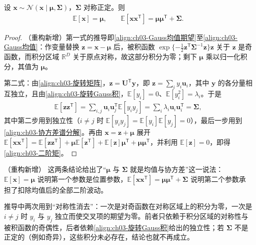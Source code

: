 \documentclass[../../main.tex]{subfiles}
\begin{document}
\begin{proposition}\label{proposition:ch03-Gauss矩}
设 $\boldsymbol{x}\sim\mathcal{N}(\boldsymbol{x}\mid\boldsymbol{\mu},\boldsymbol{\Sigma})$，$\boldsymbol{\Sigma}$ 对称正定。则
\begin{align*}
\mathbb{E}[\boldsymbol{x}]=\boldsymbol{\mu},\qquad \mathbb{E}[\boldsymbol{x}\boldsymbol{x}^{\mathsf{T}}]=\boldsymbol{\mu}\boldsymbol{\mu}^{\mathsf{T}}+\boldsymbol{\Sigma}.
\end{align*}
\end{proposition}
\begin{proof}
（重构新增）第一式的推导即\eqref{align:ch03-Gauss均值期望}至\eqref{align:ch03-Gauss均值}：作变量替换 $\boldsymbol{z}=\boldsymbol{x}-\boldsymbol{\mu}$ 后，被积函数 $\exp\{-\frac12\boldsymbol{z}^{\mathsf{T}}\boldsymbol{\Sigma}^{-1}\boldsymbol{z}\}\boldsymbol{z}$ 关于 $\boldsymbol{z}$ 是奇函数，而积分区域 $\mathbb{R}^{D}$ 关于原点对称，故这部分积分为零；剩下 $\boldsymbol{\mu}$ 乘以归一化积分，其值为 $\boldsymbol{\mu}$。

第二式：由\eqref{align:ch03-旋转矩阵}，$\boldsymbol{z}=\boldsymbol{U}^{\mathsf{T}}\boldsymbol{y}$，即 $\boldsymbol{z}=\sum_i y_i\boldsymbol{u}_i$，其中 $\boldsymbol{y}$ 的各分量相互独立，且由\eqref{align:ch03-旋转Gauss积}，$\mathbb{E}[y_i]=0$、$\mathbb{E}[y_i^{2}]=\lambda_i$。于是
\begin{align*}
\mathbb{E}[\boldsymbol{z}\boldsymbol{z}^{\mathsf{T}}]=\sum_{i,j}\boldsymbol{u}_i\boldsymbol{u}_j^{\mathsf{T}}\mathbb{E}[y_iy_j]=\sum_{i}\lambda_i\boldsymbol{u}_i\boldsymbol{u}_i^{\mathsf{T}}=\boldsymbol{\Sigma},
\end{align*}
其中第二步用到独立性（$i\neq j$ 时 $\mathbb{E}[y_iy_j]=\mathbb{E}[y_i]\mathbb{E}[y_j]=0$），最后一步用到\eqref{align:ch03-协方差谱分解}。再由 $\boldsymbol{x}=\boldsymbol{z}+\boldsymbol{\mu}$ 展开 $\mathbb{E}[\boldsymbol{x}\boldsymbol{x}^{\mathsf{T}}]=\mathbb{E}[\boldsymbol{z}\boldsymbol{z}^{\mathsf{T}}]+\boldsymbol{\mu}\mathbb{E}[\boldsymbol{z}^{\mathsf{T}}]+\mathbb{E}[\boldsymbol{z}]\boldsymbol{\mu}^{\mathsf{T}}+\boldsymbol{\mu}\boldsymbol{\mu}^{\mathsf{T}}$，并利用 $\mathbb{E}[\boldsymbol{z}]=0$，即得\eqref{align:ch03-二阶矩}。
\end{proof}

\begin{remark}（重构新增）
这两条结论给出了“$\boldsymbol{\mu}$ 与 $\boldsymbol{\Sigma}$ 就是均值与协方差”这一说法：$\mathbb{E}[\boldsymbol{x}]=\boldsymbol{\mu}$ 说明第一个参数是位置参数，$\mathbb{E}[\boldsymbol{x}\boldsymbol{x}^{\mathsf{T}}]=\boldsymbol{\mu}\boldsymbol{\mu}^{\mathsf{T}}+\boldsymbol{\Sigma}$ 说明第二个参数承担了扣除均值后的全部二阶波动。

推导中两次用到“对称性消去”：一次是对奇函数在对称区域上的积分为零，一次是 $i\neq j$ 时 $y_i$ 与 $y_j$ 独立而使交叉项的期望为零。前者只依赖于积分区域的对称性与被积函数的奇偶性，后者依赖\eqref{align:ch03-旋转Gauss积}给出的独立性；若 $\boldsymbol{\Sigma}$ 不是正定的（例如奇异），这些积分未必存在，结论也就不再成立。
\end{remark}
\end{document}
